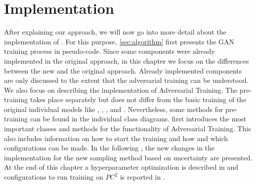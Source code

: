 \chapter{Implementation}
\label{ch:implementation}
%
After explaining our approach, we will now go into more detail about the implementation of \usgan.
For this purpose, \autoref{sec:algorithm} first presents the \ac{GAN} training process in pseudo-code.
Since some components were already implemented in the original \kbgan approach, in this chapter we focus on the differences between the new \ucgan and the original approach.
Already implemented components are only discussed to the extent that the adversarial training can be understood.
We also focus on describing the implementation of Adversarial Training.
The pre-training takes place separately but does not differ from the basic training of the original individual models like \distmult, \complex, \transe, and \transd.
Nevertheless, some methods for pre-training can be found in the individual class diagrams.
  first introduces the most important classes and methods for the functionality of Adversarial Training.
This also includes information on how to start the training and how and which configurations can be made.
In the following , the new changes in the implementation for the new sampling method based on uncertainty are presented.
At the end of this chapter a hyperparameter optimization is described in  and configurations to run training on $PC^2$ is reported in .





